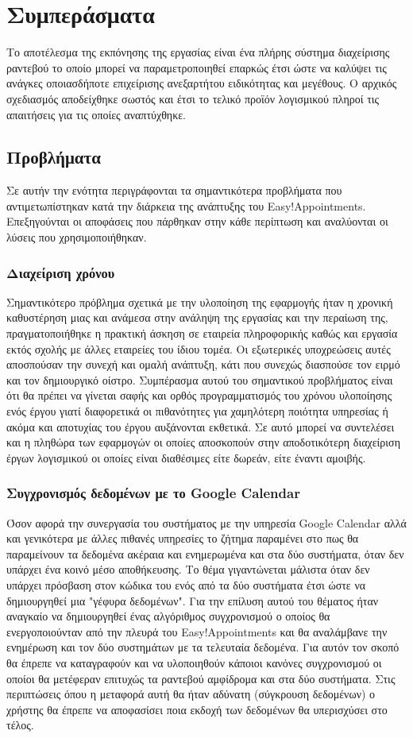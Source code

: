 \chapter{Συμπεράσματα}
Το αποτέλεσμα της εκπόνησης της εργασίας είναι ένα πλήρης σύστημα διαχείρισης ραντεβού το οποίο μπορεί να παραμετροποιηθεί επαρκώς έτσι ώστε να καλύψει τις ανάγκες οποιασδήποτε επιχείρισης ανεξαρτήτου ειδικότητας και μεγέθους. Ο αρχικός σχεδιασμός αποδείχθηκε σωστός και έτσι το τελικό προϊόν λογισμικού πληροί τις απαιτήσεις για τις οποίες αναπτύχθηκε. 

\section{Προβλήματα}
Σε αυτήν την ενότητα περιγράφονται τα σημαντικότερα προβλήματα που αντιμετωπίστηκαν κατά την διάρκεια της ανάπτυξης του Easy!Appointments. Επεξηγούνται οι αποφάσεις που πάρθηκαν στην κάθε περίπτωση και αναλύονται οι λύσεις που χρησιμοποιήθηκαν.

\subsection{Διαχείριση χρόνου}
Σημαντικότερο πρόβλημα σχετικά με την υλοποίηση της εφαρμογής ήταν η χρονική καθυστέρηση μιας και ανάμεσα στην ανάληψη της εργασίας και την περαίωση της, πραγματοποιήθηκε η πρακτική άσκηση σε εταιρεία πληροφορικής καθώς και εργασία εκτός σχολής με άλλες εταιρείες του ίδιου τομέα. Οι εξωτερικές υποχρεώσεις αυτές αποσπούσαν την συνεχή και ομαλή ανάπτυξη, κάτι που συνεχώς διασπούσε τον ειρμό και τον δημιουργικό οίστρο. Συμπέρασμα αυτού του σημαντικού προβλήματος είναι ότι θα πρέπει να γίνεται σαφής και ορθός προγραμματισμός του χρόνου υλοποίησης ενός έργου γιατί διαφορετικά οι πιθανότητες για χαμηλότερη ποιότητα υπηρεσίας ή ακόμα και αποτυχίας του έργου αυξάνονται εκθετικά. Σε αυτό μπορεί να συντελέσει και η πληθώρα των εφαρμογών οι οποίες αποσκοπούν στην αποδοτικότερη διαχείριση έργων λογισμικού οι οποίες είναι διαθέσιμες είτε δωρεάν, είτε έναντι αμοιβής.

\subsection{Συγχρονισμός δεδομένων με το Google Calendar}
Όσον αφορά την συνεργασία του συστήματος με την υπηρεσία Google Calendar αλλά και γενικότερα με άλλες πιθανές υπηρεσίες το ζήτημα παραμένει στο πως θα παραμείνουν τα δεδομένα ακέραια και ενημερωμένα και στα δύο συστήματα, όταν δεν υπάρχει ένα κοινό μέσο αποθήκευσης. Το θέμα γιγαντώνεται μάλιστα όταν δεν υπάρχει πρόσβαση στον κώδικα του ενός από τα δύο συστήματα έτσι ώστε να δημιουργηθεί μια "γέφυρα δεδομένων". Για την επίλυση αυτού του θέματος ήταν αναγκαίο να δημιουργηθεί ένας αλγόριθμος συγχρονισμού ο οποίος θα ενεργοποιούνταν από την πλευρά του Easy!Appointments και θα αναλάμβανε την ενημέρωση και τον δύο συστημάτων με τα τελευταία δεδομένα. Για αυτόν τον σκοπό θα έπρεπε να καταγραφούν και να υλοποιηθούν κάποιοι κανόνες συγχρονισμού οι οποίοι θα μετέφεραν επιτυχώς τα ραντεβού αμφίδρομα και στα δύο συστήματα. Στις περιπτώσεις όπου η μεταφορά αυτή θα ήταν αδύνατη (σύγκρουση δεδομένων) ο χρήστης θα έπρεπε να αποφασίσει ποια εκδοχή των δεδομένων θα υπερισχύσει στο τέλος.

